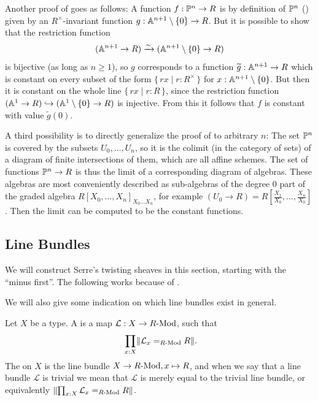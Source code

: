 \begin{remark}
  Another proof of 
  goes as follows:
  A function $f : \mathbb{P}^n \to R$
  is by definition of $\mathbb{P}^n$
  ()
  given by an $R^{\times}$-invariant function
  $g : \mathbb{A}^{n+1}\setminus\{0\} \to R$.
  But it is possible to show that the restriction function
  \[ (\mathbb{A}^{n+1} \to R) \xrightarrow{\sim} (\mathbb{A}^{n+1}\setminus\{0\} \to R) \]
  is bijective
  (as long as $n \geq 1$),
  so $g$ corresponds to a function $\widetilde{g} : \mathbb{A}^{n+1} \to R$
  which is constant on every subset of the form
  $\{\, rx \mid r : R^{\times} \,\}$
  for $x : \mathbb{A}^{n+1} \setminus \{0\}$.
  But then it is constant on the whole line
  $\{\, rx \mid r : R \,\}$,
  since the restriction function
  $(\mathbb{A}^1 \to R) \hookrightarrow (\mathbb{A}^1\setminus\{0\} \to R)$
  is injective.
  From this it follows that $f$ is constant with value $\widetilde{g}(0)$.

  A third possibility is to directly generalize the proof of
   to arbitrary $n$:
  The set $\mathbb{P}^n$ is covered by the subsets $U_0, \dots, U_n$,
  so it is the colimit (in the category of sets) of a diagram
  of finite intersections of them,
  which are all affine schemes.
  The set of functions $\mathbb{P}^n \to R$
  is thus the limit of a corresponding diagram of algebras.
  These algebras are most conveniently described as sub-algebras
  of the degree $0$ part of the graded algebra
  ${R[X_0, \dots, X_n]}_{X_0 \dots X_n}$,
  for example
  $(U_0 \to R) = R[\frac{X_1}{X_0}, \dots, \frac{X_n}{X_0}]$.
  Then the limit can be computed to be the constant functions.
\end{remark}


\subsection{Line Bundles}

We will construct Serre's twisting sheaves in this section,
starting with the ``minus first''.
The following works because of .

We will also give some indication on which line bundles exist in general.

\begin{definition}%
  Let $X$ be a type.
  A  is a map $\mathcal L : X\to R\text{-}\mathrm{Mod}$,
  such that
  \[ \prod_{x:X} \propTrunc{\mathcal L_x=_{\Mod{R}}R} \rlap{.}\]
  The  on $X$ is the line bundle
  $X \to R\text{-}\mathrm{Mod}, x \mapsto R$,
  and when we say that a line bundle $\mathcal{L}$ is trivial
  we mean that $\mathcal{L}$ is merely equal to the trivial line bundle,
  or equivalently $\lVert \prod_{x:X} \mathcal L_x=_{R\text{-}\mathrm{Mod}}R \rVert$.
\end{definition}

